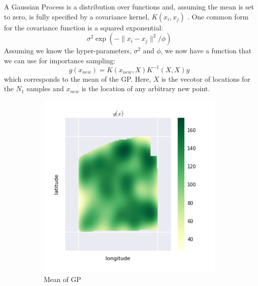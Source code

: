 \documentclass[thesis]{hmcposter}
\begin{document}
\begin{poster}
A Gaussian Process is a distribution over functions and, assuming the mean is set to zero, is fully specified by a covariance kernel, $K(x_i, x_j)$ \cite{rasmussen}. One common form for the covariance function is a squared exponential: $$\sigma^2 \exp{\left(-\|x_i - x_j\|^2 / \phi\right)}$$ Assuming we know the hyper-parameters, $\sigma^2$ and $\phi$, we now have a function that we can use for importance sampling: $$g(x_{new}) = K(x_{new}, X)K^{-1}(X,X)y$$ which corresponds to the mean of the GP. Here, $X$ is the vecotor of locations for the $N_1$ samples and $x_{new}$ is the location of any arbitrary new point.

\begin{figure}
\begin{center}
  \begin{subfigure}[b]{6.75in}
    \centering
    \includegraphics[width=\linewidth]{figures/gp}
    \caption*{Mean of GP}%
    \label{fig:resids_lat}
  \end{subfigure}
  \begin{subfigure}[b]{6.75in}
    \centering

\end{subfigure}
\end{center}
\end{figure}
\end{poster}
\end{document}

